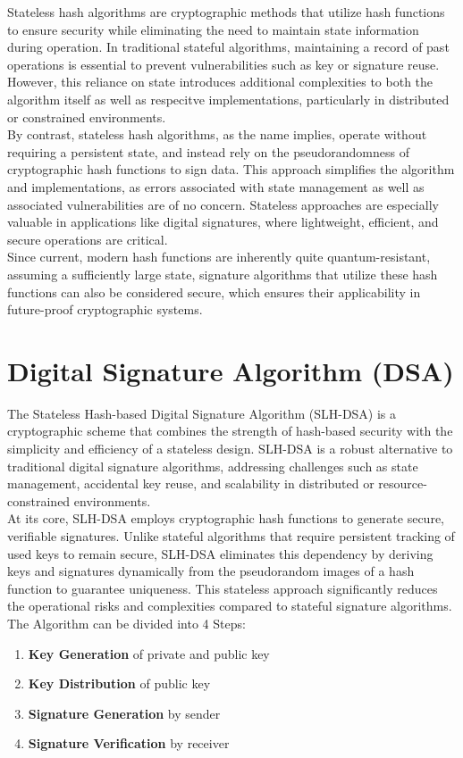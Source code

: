 \documentclass[journal=tosc,notanonymous]{iacrtrans}
\begin{document}
Stateless hash algorithms are cryptographic methods that utilize hash functions to ensure security while eliminating the need to maintain state information during operation.
In traditional stateful algorithms, maintaining a record of past operations is essential to prevent vulnerabilities such as key or signature reuse.
However, this reliance on state introduces additional complexities to both the algorithm itself as well as respecitve implementations, particularly in distributed or constrained environments.
\\
By contrast, stateless hash algorithms, as the name implies, operate without requiring a persistent state, and instead rely on the pseudorandomness of cryptographic hash functions to sign data.
This approach simplifies the algorithm and implementations, as errors associated with state management as well as associated vulnerabilities are of no concern.
Stateless approaches are especially valuable in applications like digital signatures, where lightweight, efficient, and secure operations are critical.
\\
Since current, modern hash functions are inherently quite quantum-resistant, assuming a sufficiently large state, signature algorithms that utilize these hash functions can also be considered secure, which ensures their applicability in future-proof cryptographic systems.

\section{Digital Signature Algorithm (DSA)}

The Stateless Hash-based Digital Signature Algorithm (SLH-DSA) is a cryptographic scheme that combines the strength of hash-based security with the simplicity and efficiency of a stateless design. SLH-DSA is a robust alternative to traditional digital signature algorithms, addressing challenges such as state management, accidental key reuse, and scalability in distributed or resource-constrained environments.
\\
At its core, SLH-DSA employs cryptographic hash functions to generate secure, verifiable signatures. Unlike stateful algorithms that require persistent tracking of used keys to remain secure, SLH-DSA eliminates this dependency by deriving keys and signatures dynamically from the pseudorandom images of a hash function to guarantee uniqueness.
This stateless approach significantly reduces the operational risks and complexities compared to stateful signature algorithms.
\\
The Algorithm can be divided into 4 Steps:
\begin{enumerate}
	\item \textbf{Key Generation} of private and public key
	\item \textbf{Key Distribution} of public key
	\item \textbf{Signature Generation} by sender
	\item \textbf{Signature Verification} by receiver
\end{enumerate}
\end{document}
